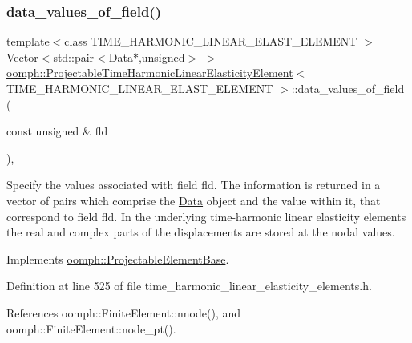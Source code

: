 \subsubsection{\texorpdfstring{data\+\_\+values\+\_\+of\+\_\+field()}{data\_values\_of\_field()}}
{\footnotesize\ttfamily template$<$class T\+I\+M\+E\+\_\+\+H\+A\+R\+M\+O\+N\+I\+C\+\_\+\+L\+I\+N\+E\+A\+R\+\_\+\+E\+L\+A\+S\+T\+\_\+\+E\+L\+E\+M\+E\+NT $>$ \\
\hyperlink{classoomph_1_1Vector}{Vector}$<$std\+::pair$<$\hyperlink{classoomph_1_1Data}{Data}$\ast$,unsigned$>$ $>$ \hyperlink{classoomph_1_1ProjectableTimeHarmonicLinearElasticityElement}{oomph\+::\+Projectable\+Time\+Harmonic\+Linear\+Elasticity\+Element}$<$ T\+I\+M\+E\+\_\+\+H\+A\+R\+M\+O\+N\+I\+C\+\_\+\+L\+I\+N\+E\+A\+R\+\_\+\+E\+L\+A\+S\+T\+\_\+\+E\+L\+E\+M\+E\+NT $>$\+::data\+\_\+values\+\_\+of\+\_\+field (\begin{DoxyParamCaption}\item[{const unsigned \&}]{fld }\end{DoxyParamCaption})\hspace{0.3cm}{\ttfamily [inline]}, {\ttfamily [virtual]}}



Specify the values associated with field fld. The information is returned in a vector of pairs which comprise the \hyperlink{classoomph_1_1Data}{Data} object and the value within it, that correspond to field fld. In the underlying time-\/harmonic linear elasticity elements the real and complex parts of the displacements are stored at the nodal values. 



Implements \hyperlink{classoomph_1_1ProjectableElementBase_a644306ebdf16f334344c2d27d72f18b7}{oomph\+::\+Projectable\+Element\+Base}.



Definition at line 525 of file time\+\_\+harmonic\+\_\+linear\+\_\+elasticity\+\_\+elements.\+h.



References oomph\+::\+Finite\+Element\+::nnode(), and oomph\+::\+Finite\+Element\+::node\+\_\+pt().

\mbox{\label{classoomph_1_1ProjectableTimeHarmonicLinearElasticityElement_ac65b20b221ae454e0b236612ebd3e30b}} 

